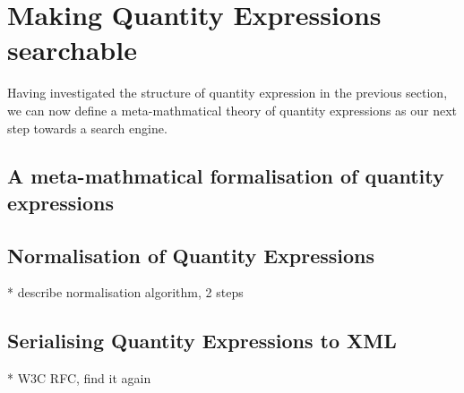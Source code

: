\section{Making Quantity Expressions searchable}
Having investigated the structure of quantity expression in the previous section, we can now define a meta-mathmatical theory of quantity expressions as our next step towards a search engine.

\subsection{A meta-mathmatical formalisation of quantity expressions}
\label{sec:meq_model}

\subsection{Normalisation of Quantity Expressions}
* describe normalisation algorithm, 2 steps

\subsection{Serialising Quantity Expressions to XML}
* W3C RFC, find it again






